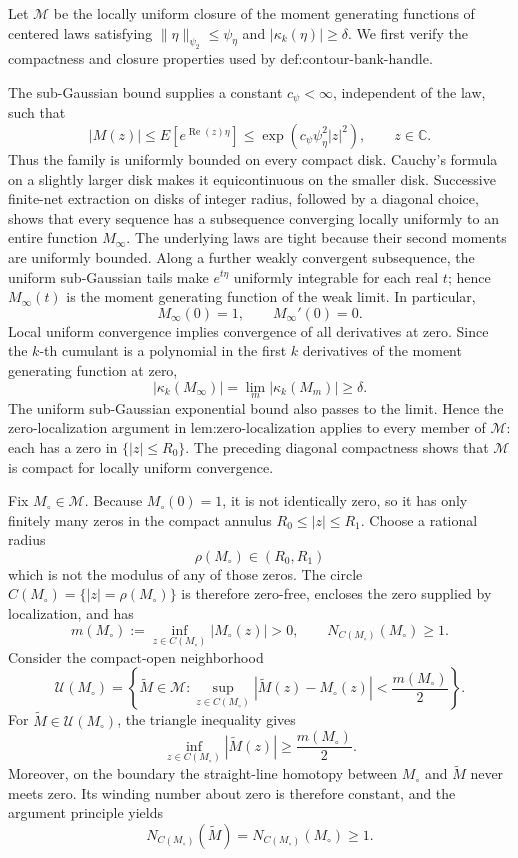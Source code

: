Let \(\mathscr M\) be the locally uniform closure of the moment generating functions of centered laws satisfying \(\lVert\eta\rVert_{\psi_2}\le\psi_\eta\) and \(\lvert\kappa_k(\eta)\rvert\ge\delta\).  We first verify the compactness and closure properties used by \(\text{def:contour-bank-handle}\).

The sub-Gaussian bound supplies a constant \(c_\psi<\infty\), independent of the law, such that
\[
 |M(z)|
 \le E[e^{\operatorname{Re}(z)\eta}]
 \le\exp(c_\psi\psi_\eta^2|z|^2),
 \qquad z\in\mathbb C.
\]
Thus the family is uniformly bounded on every compact disk.  Cauchy's formula on a slightly larger disk makes it equicontinuous on the smaller disk.  Successive finite-net extraction on disks of integer radius, followed by a diagonal choice, shows that every sequence has a subsequence converging locally uniformly to an entire function \(M_\infty\).  The underlying laws are tight because their second moments are uniformly bounded.  Along a further weakly convergent subsequence, the uniform sub-Gaussian tails make \(e^{t\eta}\) uniformly integrable for each real \(t\); hence \(M_\infty(t)\) is the moment generating function of the weak limit.  In particular,
\[
 M_\infty(0)=1,
 \qquad
 M_\infty'(0)=0.
\]
Local uniform convergence implies convergence of all derivatives at zero.  Since the \(k\)-th cumulant is a polynomial in the first \(k\) derivatives of the moment generating function at zero,
\[
 |\kappa_k(M_\infty)|
 =\lim_m|\kappa_k(M_m)|\ge\delta.
\]
The uniform sub-Gaussian exponential bound also passes to the limit.  Hence the zero-localization argument in \(\text{lem:zero-localization}\) applies to every member of \(\mathscr M\): each has a zero in \(\{|z|\le R_0\}\).  The preceding diagonal compactness shows that \(\mathscr M\) is compact for locally uniform convergence.

Fix \(M_\circ\in\mathscr M\).  Because \(M_\circ(0)=1\), it is not identically zero, so it has only finitely many zeros in the compact annulus \(R_0\le|z|\le R_1\).  Choose a rational radius
\[
 \rho(M_\circ)\in(R_0,R_1)
\]
which is not the modulus of any of those zeros.  The circle \(C(M_\circ)=\{|z|=\rho(M_\circ)\}\) is therefore zero-free, encloses the zero supplied by localization, and has
\[
 m(M_\circ):=\inf_{z\in C(M_\circ)}|M_\circ(z)|>0,
 \qquad
 N_{C(M_\circ)}(M_\circ)\ge1.
\]
Consider the compact-open neighborhood
\[
 \mathcal U(M_\circ)
 =\left\{\widetilde M\in\mathscr M:
   \sup_{z\in C(M_\circ)}|\widetilde M(z)-M_\circ(z)|
   <\frac{m(M_\circ)}2
  \right\}.
\]
For \(\widetilde M\in\mathcal U(M_\circ)\), the triangle inequality gives
\[
 \inf_{z\in C(M_\circ)}|\widetilde M(z)|
 \ge\frac{m(M_\circ)}2.
\]
Moreover, on the boundary the straight-line homotopy between \(M_\circ\) and \(\widetilde M\) never meets zero.  Its winding number about zero is therefore constant, and the argument principle yields
\[
 N_{C(M_\circ)}(\widetilde M)
 =N_{C(M_\circ)}(M_\circ)\ge1.
\]

